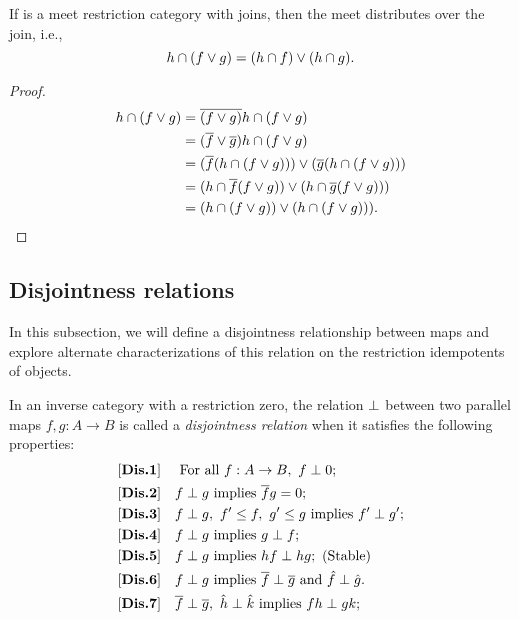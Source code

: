 \begin{lemma}\label{lem:meet_distributes_over_join}
  If \R is a meet restriction category with joins, then the meet distributes over the join, i.e.,
  \[
    h\cap(f\vee g) = (h\cap f)\vee (h\cap g).
  \]
\end{lemma}
\begin{proof}
  \begin{align*}
    h\cap(f\vee g) &= \overline{(f\vee g)} h\cap (f\vee g)\\
    &= (\overline{f}\vee \overline{g}) h\cap (f\vee g)\\
    &= (\overline{f}(h\cap (f\vee g))) \vee (\overline{g}(h\cap (f\vee g)))\\
    &= (h\cap \overline{f}(f\vee g)) \vee (h\cap \overline{g}(f\vee g)))\\
    &= (h\cap (f\vee g)) \vee (h\cap (f\vee g))).
  \end{align*}
\end{proof}


\subsection{Disjointness relations} %
\label{sub:disjointness_relations}
In this subsection, we will define a disjointness relationship between maps and
explore alternate characterizations of this relation on the restriction idempotents of objects.

\begin{definition}\label{def:disjointness_relation}
  In an inverse category \X with a restriction zero, the relation $\perp$ between two parallel
  maps $f, g:A \to B$ is called a \emph{disjointness relation} when it satisfies the following
  properties:
  \begin{align*}
    \axiom{Dis}{1}\quad &\text{ For all }f:A\to B,\ f\cdperp 0;\\
    \axiom{Dis}{2}\quad &f\cdperp g\text{ implies }\rst{f} g = 0; \\
    \axiom{Dis}{3}\quad &f\cdperp g,\ f' \le f,\ g' \le g\text{ implies }f' \cdperp g';\\
    \axiom{Dis}{4}\quad &f\cdperp g\text{ implies }g \cdperp f;\\
    \axiom{Dis}{5}\quad &f\cdperp g\text{ implies }h f \cdperp h g; \text{ (Stable)}\\
    \axiom{Dis}{6}\quad &f\cdperp g\text{ implies }\rst{f} \cdperp \rst{g}
      \text{ and }\rg{f}\cdperp\rg{g}.\\
    \axiom{Dis}{7}\quad &\rst{f}\cdperp \rst{g},\ \rg{h}\cdperp \rg{k}\text{ implies }f h
      \cdperp g k;
  \end{align*}
\end{definition}

